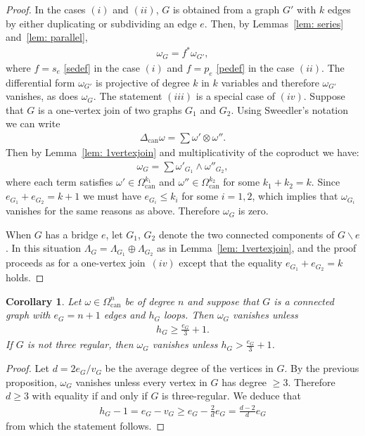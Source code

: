 \documentclass[pdftex]{sigma}%
\newtheorem{cor}[thm]{Corollary}
\numberwithin{equation}{section}
\newcommand{\can}{\mathrm{can}}
\newcommand{\0}{\color{blue}{\mathsf{0}}}
\begin{document}
\begin{proof} In the cases $(i)$ and $(ii)$, $G$ is obtained from a graph $G'$ with $k$ edges by either duplicating or subdividing an edge $e$. Then, by Lemmas~\ref{lem: series} and~\ref{lem: parallel},
\begin{gather*}
\omega_G = f^* \omega_{G'},
\end{gather*}
where $f= s_e$ \eqref{sedef} in the case $(i)$ and $f=p_e$ \eqref{pedef} in the case $(ii)$. The differential form $\omega_{G'}$ is projective of degree $k$ in $k$ variables and therefore $\omega_{G'}$ vanishes, as does $\omega_G$.
The statement $(iii)$ is a special case of $(iv)$.
Suppose that $G$ is a one-vertex join of two graphs $G_1$ and $G_2$. Using Sweedler's notation we can write
\begin{gather*}
\Delta_{\can} \omega = \sum \omega' \otimes \omega'' .
\end{gather*}
Then by Lemma~\ref{lem: 1vertexjoin} and multiplicativity of the coproduct we have:
\begin{gather*}
\omega_G = \sum \omega'_{G_1} \wedge \omega''_{G_2},
\end{gather*}
 where each term satisfies $\omega' \in \Omega_{\can}^{k_1}$ and $\omega'' \in \Omega_{\can}^{k_2}$ for some $k_1+ k_2 = k$. Since $e_{G_1} + e_{G_2} = k+1$ we must have $e_{G_i} \leq k_i$ for some $i=1,2$, which implies that $\omega_{G_i}$ vanishes for the same reasons as above. Therefore $\omega_G$ is zero.

When $G$ has a bridge $e$, let $G_1$, $G_2$ denote the two connected components of $G\backslash e$. In this situation $\Lambda_G = \Lambda_{G_1} \oplus \Lambda_{G_2}$ as in Lemma~\ref{lem: 1vertexjoin}, and the proof proceeds as for a one-vertex join~$(iv)$ except that the equality
$e_{G_1} +e_{G_2} = k$ holds.
\end{proof}

\begin{cor} %
Let $\omega \in \Omega^n_{\can}$ be of degree $n$ and suppose that $G$ is a connected graph with $e_G=n+1$ edges and $h_G$ loops. Then $\omega_G$ vanishes unless
\begin{gather*} %
h_G \geq \frac{e_G}{3} + 1.
\end{gather*}
If $G$ is not three regular, then $\omega_G$ vanishes unless
 $h_G > \frac{e_G}{3} +1$.
 \end{cor}
\begin{proof}
Let $d = 2e_G/ v_G$ be the average degree of the vertices in $G$. By the previous proposition, $\omega_G$ vanishes unless every vertex in $G$ has degree $\geq 3$. Therefore $d\geq 3$ with equality if and only if $G$ is three-regular. We deduce that
\begin{gather*}
h_G -1 = e_G - v_G \geq e_G - \frac{2}{d} e_G = \frac{d-2}{d} e_G
\end{gather*}
from which the statement follows.
\end{proof}
\end{document}

